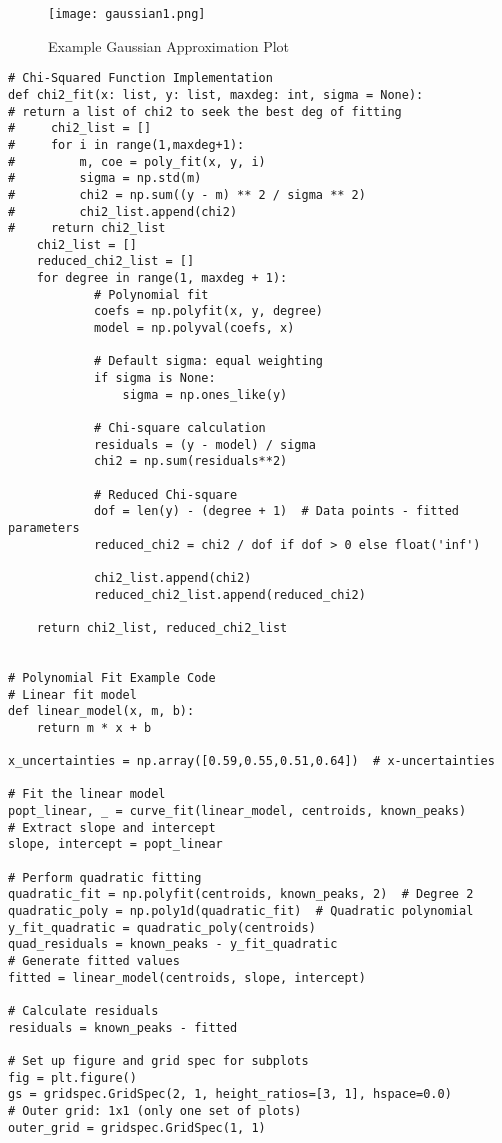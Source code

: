 \documentclass[10pt, preprint]{aastex}
\begin{document}
\begin{figure}[H]
\centering
\texttt{[image: gaussian1.png]}
\caption{\label{fig:ne}Example Gaussian Approximation Plot}
\end{figure}
\begin{verbatim}
# Chi-Squared Function Implementation
def chi2_fit(x: list, y: list, maxdeg: int, sigma = None):
# return a list of chi2 to seek the best deg of fitting
#     chi2_list = []
#     for i in range(1,maxdeg+1):
#         m, coe = poly_fit(x, y, i)
#         sigma = np.std(m)
#         chi2 = np.sum((y - m) ** 2 / sigma ** 2)
#         chi2_list.append(chi2)
#     return chi2_list
    chi2_list = []
    reduced_chi2_list = []
    for degree in range(1, maxdeg + 1):
            # Polynomial fit
            coefs = np.polyfit(x, y, degree)
            model = np.polyval(coefs, x)

            # Default sigma: equal weighting
            if sigma is None:
                sigma = np.ones_like(y)

            # Chi-square calculation
            residuals = (y - model) / sigma
            chi2 = np.sum(residuals**2)

            # Reduced Chi-square
            dof = len(y) - (degree + 1)  # Data points - fitted parameters
            reduced_chi2 = chi2 / dof if dof > 0 else float('inf')

            chi2_list.append(chi2)
            reduced_chi2_list.append(reduced_chi2)

    return chi2_list, reduced_chi2_list
    

# Polynomial Fit Example Code
# Linear fit model
def linear_model(x, m, b):
    return m * x + b

x_uncertainties = np.array([0.59,0.55,0.51,0.64])  # x-uncertainties

# Fit the linear model
popt_linear, _ = curve_fit(linear_model, centroids, known_peaks)
# Extract slope and intercept
slope, intercept = popt_linear

# Perform quadratic fitting
quadratic_fit = np.polyfit(centroids, known_peaks, 2)  # Degree 2
quadratic_poly = np.poly1d(quadratic_fit)  # Quadratic polynomial
y_fit_quadratic = quadratic_poly(centroids)
quad_residuals = known_peaks - y_fit_quadratic
# Generate fitted values
fitted = linear_model(centroids, slope, intercept)

# Calculate residuals
residuals = known_peaks - fitted

# Set up figure and grid spec for subplots
fig = plt.figure()
gs = gridspec.GridSpec(2, 1, height_ratios=[3, 1], hspace=0.0)
# Outer grid: 1x1 (only one set of plots)
outer_grid = gridspec.GridSpec(1, 1)


\end{verbatim}
\end{document}
